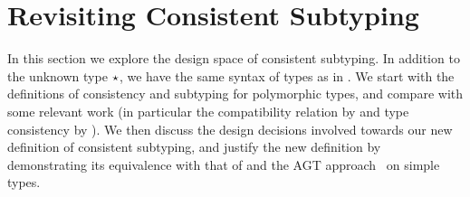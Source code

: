 \section{Revisiting Consistent Subtyping}
\label{sec:exploration}

In this section we explore the design space of consistent subtyping. In addition
to the unknown type $\star$, we have the same syntax of types as in
. We start with the definitions of consistency and
subtyping for polymorphic types, and compare with some relevant work (in
particular the compatibility relation by \citet{ahmed2011blame} and type
consistency by \citet{yuu2017poly}). We then discuss the design decisions
involved towards our new definition of consistent subtyping, and justify the new
definition by demonstrating its equivalence with that of \citet{siek2007gradual}
and the AGT approach~\cite{garcia2016abstracting} on simple types.






